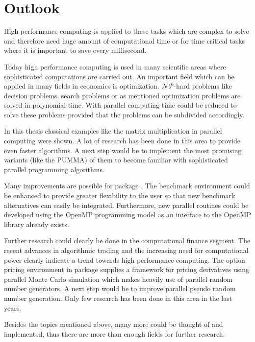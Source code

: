 \section{Outlook}

High performance computing is applied to these tasks which are complex
to solve and therefore need huge amount of computational time or for
time critical tasks where it is important to save every millisecond. 

Today high performance computing is used in many scientific areas
where sophisticated computations are carried out. An important field
which can be applied in many fields in economics is
optimization. $\mathcal{NP}$-hard problems like decision problems,
search problems or as mentioned optimization problems are solved in
polynomial time. With parallel computing time could be reduced to
solve these problems provided that the problems can be subdivided
accordingly.

In this thesis classical examples like the matrix multiplication in
parallel computing were shown. A lot of research has been done in this
area to provide even faster algorithms. A next step would be to implement
the most promising variants (like the PUMMA) of them to become
familiar with sophisticated parallel programming algorithms.

Many improvements are possible for package . The benchmark
environment could be enhanced to provide greater flexibility to the
user so that new
benchmark alternatives can easily be integrated. Furthermore, new
parallel routines could be developed using the OpenMP programming
model as an interface to the OpenMP library already exists. 

Further research could clearly be done in the computational finance
segment. The recent advances in algorithmic trading and the increasing
need for computational power clearly indicate a trend towards high
performance computing. The option pricing environment in package
 supplies a framework for pricing derivatives using parallel
Monte Carlo simulation which makes heavily use of parallel random
number generators. A next step would be to improve parallel pseudo
random number generation. Only few research has been done in this area
in the last years. 

Besides the topics mentioned above, many more could be thought of and
implemented, thus there are more than enough fields for further
research.



